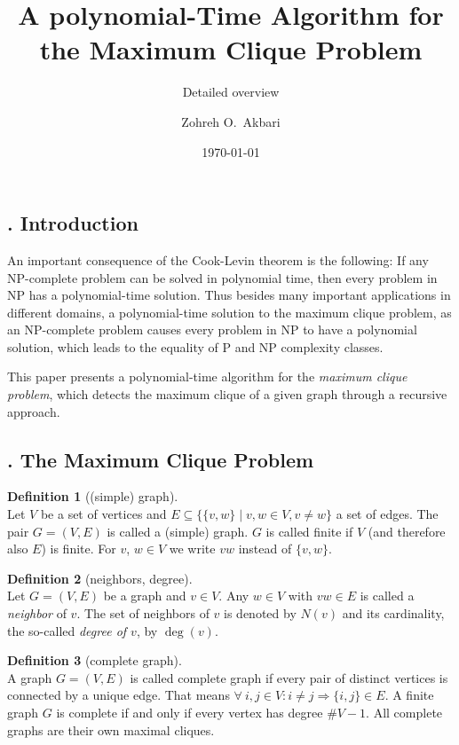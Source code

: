 \documentclass[12pt, xcolor=dvipsnames]{scrartcl}
\title{A polynomial-Time Algorithm for the Maximum Clique Problem}
\subtitle{Detailed overview}
\author{Zohreh O.~Akbari}
\date{\today}
\theoremstyle{definition}
\newtheorem{definition}{Definition}%
\newcommand{\card}[1]{\# #1}
\theoremstyle{definition}
\begin{document}
\maketitle

\newpage

\subsection*{. Introduction}
An important consequence of the Cook-Levin theorem is the following: If any NP-complete problem can be solved in polynomial time, then every problem in NP has a polynomial-time solution. Thus besides many important applications in different domains, a polynomial-time solution to the maximum clique problem, as an NP-complete problem causes every problem in NP to have a polynomial solution, which leads to the equality of P and NP complexity classes.

This paper presents a polynomial-time algorithm for the \textit{maximum clique problem}, which detects the maximum clique of a given graph through a recursive approach.

\subsection*{. The Maximum Clique Problem}

\begin{definition}[(simple) graph]\ \\
    Let $V$ be a set of vertices and $E \subseteq \{ \{v,w\} \mid v,w \in V, v \neq w\}$ a set of edges. The pair $G = (V,E)$ is called a (simple) graph.
    $G$ is called finite if $V$ (and therefore also $E$) is finite.
    For $v$, $w \in V$ we write $vw$ instead of $\{v,w\}$.
\end{definition}

\begin{definition}[neighbors, degree]\ \\
	Let $G = (V,E)$ be a graph and $v\in V$. 
	Any $w \in V$ with $vw\in E$ is called a \emph{neighbor} of $v$.
	The set of neighbors of $v$ is denoted by $N(v)$ and its cardinality,
	the so-called \emph{degree of $v$}, by $\deg(v)$.	
\end{definition}

\begin{definition}[complete graph]\ \\
    A graph $G = (V,E)$ is called complete graph
    if every pair of distinct vertices is connected by a unique edge. 
    That means $\forall ~ i,j \in V\colon i \neq j \Longrightarrow \{i,j\} \in E$.
    A finite graph $G$ is complete if and only if 
    every vertex has degree $\card V - 1$. 
    All complete graphs are their own maximal cliques.
\end{definition}
\end{document}
